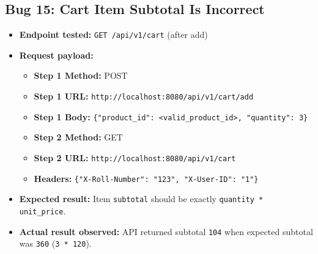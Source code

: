 ﻿\documentclass[11pt,a4paper]{article}
\begin{document}
\subsection*{Bug 15: Cart Item Subtotal Is Incorrect}
\begin{itemize}
  \item \textbf{Endpoint tested:} \texttt{GET /api/v1/cart} (after add)
  \item \textbf{Request payload:}
  \begin{itemize}
    \item \textbf{Step 1 Method:} POST
    \item \textbf{Step 1 URL:} \texttt{http://localhost:8080/api/v1/cart/add}
    \item \textbf{Step 1 Body:} \texttt{\{"product_id": <valid_product_id>, "quantity": 3\}}
    \item \textbf{Step 2 Method:} GET
    \item \textbf{Step 2 URL:} \texttt{http://localhost:8080/api/v1/cart}
    \item \textbf{Headers:} \texttt{\{"X-Roll-Number": "123", "X-User-ID": "1"\}}
  \end{itemize}
  \item \textbf{Expected result:} Item \texttt{subtotal} should be exactly \texttt{quantity * unit_price}.
  \item \textbf{Actual result observed:} API returned subtotal \texttt{104} when expected subtotal was \texttt{360} (\texttt{3 * 120}).
\end{itemize}
\end{document}
